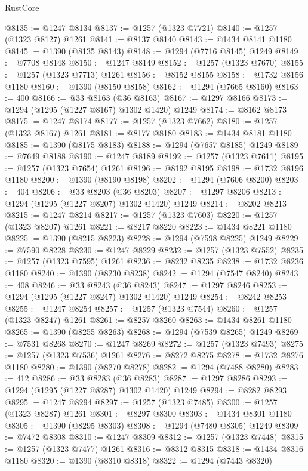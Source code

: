 \begin{lexlean}{RustCore}
\begin{coremodule}
@8135 := @1247 @8134
@8137 := @1257 (@1323 @7721)
@8140 := @1257 (@1323 @8127) @1261
@8141 := @8137 @8140
@8143 := @1434 @8141 @1180
@8145 := @1390 (@8135 @8143)
@8148 := @1294 (@7716 @8145) @1249
@8149 := @7708 @8148
@8150 := @1247 @8149
@8152 := @1257 (@1323 @7670)
@8155 := @1257 (@1323 @7713) @1261
@8156 := @8152 @8155
@8158 := @1732 @8156 @1180
@8160 := @1390 (@8150 @8158)
@8162 := @1294 (@7665 @8160)
@8163 := 400
@8166 := @33 @8163 (@36 @8163)
@8167 := @1297 @8166
@8173 := @1294 (@1295 (@1227 @8167) @1302 @1420) @1249
@8174 := @8162 @8173
@8175 := @1247 @8174
@8177 := @1257 (@1323 @7662)
@8180 := @1257 (@1323 @8167) @1261
@8181 := @8177 @8180
@8183 := @1434 @8181 @1180
@8185 := @1390 (@8175 @8183)
@8188 := @1294 (@7657 @8185) @1249
@8189 := @7649 @8188
@8190 := @1247 @8189
@8192 := @1257 (@1323 @7611)
@8195 := @1257 (@1323 @7654) @1261
@8196 := @8192 @8195
@8198 := @1732 @8196 @1180
@8200 := @1390 (@8190 @8198)
@8202 := @1294 (@7606 @8200)
@8203 := 404
@8206 := @33 @8203 (@36 @8203)
@8207 := @1297 @8206
@8213 := @1294 (@1295 (@1227 @8207) @1302 @1420) @1249
@8214 := @8202 @8213
@8215 := @1247 @8214
@8217 := @1257 (@1323 @7603)
@8220 := @1257 (@1323 @8207) @1261
@8221 := @8217 @8220
@8223 := @1434 @8221 @1180
@8225 := @1390 (@8215 @8223)
@8228 := @1294 (@7598 @8225) @1249
@8229 := @7590 @8228
@8230 := @1247 @8229
@8232 := @1257 (@1323 @7552)
@8235 := @1257 (@1323 @7595) @1261
@8236 := @8232 @8235
@8238 := @1732 @8236 @1180
@8240 := @1390 (@8230 @8238)
@8242 := @1294 (@7547 @8240)
@8243 := 408
@8246 := @33 @8243 (@36 @8243)
@8247 := @1297 @8246
@8253 := @1294 (@1295 (@1227 @8247) @1302 @1420) @1249
@8254 := @8242 @8253
@8255 := @1247 @8254
@8257 := @1257 (@1323 @7544)
@8260 := @1257 (@1323 @8247) @1261
@8261 := @8257 @8260
@8263 := @1434 @8261 @1180
@8265 := @1390 (@8255 @8263)
@8268 := @1294 (@7539 @8265) @1249
@8269 := @7531 @8268
@8270 := @1247 @8269
@8272 := @1257 (@1323 @7493)
@8275 := @1257 (@1323 @7536) @1261
@8276 := @8272 @8275
@8278 := @1732 @8276 @1180
@8280 := @1390 (@8270 @8278)
@8282 := @1294 (@7488 @8280)
@8283 := 412
@8286 := @33 @8283 (@36 @8283)
@8287 := @1297 @8286
@8293 := @1294 (@1295 (@1227 @8287) @1302 @1420) @1249
@8294 := @8282 @8293
@8295 := @1247 @8294
@8297 := @1257 (@1323 @7485)
@8300 := @1257 (@1323 @8287) @1261
@8301 := @8297 @8300
@8303 := @1434 @8301 @1180
@8305 := @1390 (@8295 @8303)
@8308 := @1294 (@7480 @8305) @1249
@8309 := @7472 @8308
@8310 := @1247 @8309
@8312 := @1257 (@1323 @7448)
@8315 := @1257 (@1323 @7477) @1261
@8316 := @8312 @8315
@8318 := @1434 @8316 @1180
@8320 := @1390 (@8310 @8318)
@8322 := @1294 (@7443 @8320)

\end{coremodule}
\end{lexlean}
